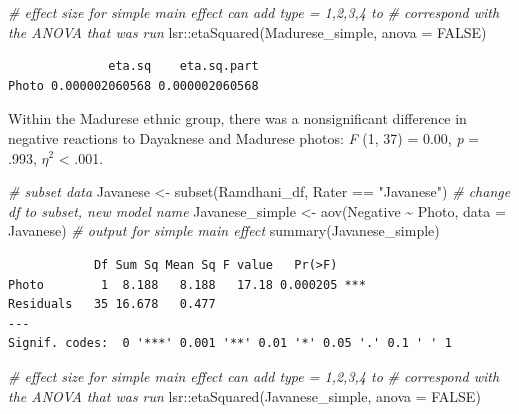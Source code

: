\documentclass[
  11pt,
]{book}
\newenvironment{Shaded}{\begin{snugshade}}{\end{snugshade}}
\newcommand{\AttributeTok}[1]{\textcolor[rgb]{0.77,0.63,0.00}{#1}}
\newcommand{\CommentTok}[1]{\textcolor[rgb]{0.56,0.35,0.01}{\textit{#1}}}
\newcommand{\ConstantTok}[1]{\textcolor[rgb]{0.00,0.00,0.00}{#1}}
\newcommand{\FunctionTok}[1]{\textcolor[rgb]{0.00,0.00,0.00}{#1}}
\newcommand{\NormalTok}[1]{#1}
\newcommand{\OtherTok}[1]{\textcolor[rgb]{0.56,0.35,0.01}{#1}}
\newcommand{\SpecialCharTok}[1]{\textcolor[rgb]{0.00,0.00,0.00}{#1}}
\newcommand{\StringTok}[1]{\textcolor[rgb]{0.31,0.60,0.02}{#1}}
\begin{document}
\begin{Shaded}
\begin{Highlighting}[]
\CommentTok{\# effect size for simple main effect can add \textquotesingle{}type = 1,2,3,4\textquotesingle{} to}
\CommentTok{\# correspond with the ANOVA that was run}
\NormalTok{lsr}\SpecialCharTok{::}\FunctionTok{etaSquared}\NormalTok{(Madurese\_simple, }\AttributeTok{anova =} \ConstantTok{FALSE}\NormalTok{)}
\end{Highlighting}
\end{Shaded}

\begin{verbatim}
              eta.sq    eta.sq.part
Photo 0.000002060568 0.000002060568
\end{verbatim}

Within the Madurese ethnic group, there was a nonsignificant difference in negative reactions to Dayaknese and Madurese photos: \emph{F} (1, 37) = 0.00, \emph{p} = .993, \(\eta ^{2}\) \textless{} .001.

\begin{Shaded}
\begin{Highlighting}[]
\CommentTok{\# subset data}
\NormalTok{Javanese }\OtherTok{\textless{}{-}} \FunctionTok{subset}\NormalTok{(Ramdhani\_df, Rater }\SpecialCharTok{==} \StringTok{"Javanese"}\NormalTok{)}
\CommentTok{\# change df to subset, new model name}
\NormalTok{Javanese\_simple }\OtherTok{\textless{}{-}} \FunctionTok{aov}\NormalTok{(Negative }\SpecialCharTok{\textasciitilde{}}\NormalTok{ Photo, }\AttributeTok{data =}\NormalTok{ Javanese)}
\CommentTok{\# output for simple main effect}
\FunctionTok{summary}\NormalTok{(Javanese\_simple)}
\end{Highlighting}
\end{Shaded}

\begin{verbatim}
            Df Sum Sq Mean Sq F value   Pr(>F)    
Photo        1  8.188   8.188   17.18 0.000205 ***
Residuals   35 16.678   0.477                     
---
Signif. codes:  0 '***' 0.001 '**' 0.01 '*' 0.05 '.' 0.1 ' ' 1
\end{verbatim}

\begin{Shaded}
\begin{Highlighting}[]
\CommentTok{\# effect size for simple main effect can add \textquotesingle{}type = 1,2,3,4\textquotesingle{} to}
\CommentTok{\# correspond with the ANOVA that was run}
\NormalTok{lsr}\SpecialCharTok{::}\FunctionTok{etaSquared}\NormalTok{(Javanese\_simple, }\AttributeTok{anova =} \ConstantTok{FALSE}\NormalTok{)}
\end{Highlighting}
\end{Shaded}
\end{document}
